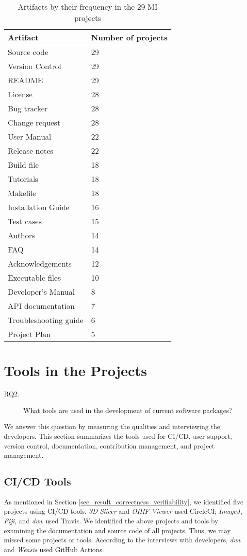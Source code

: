 \begin{table}[H]
\centering
\begin{tabular}{ll}
\hline
Artifact & Number of projects \\ \hline
Source code & 29 \\
Version Control & 29 \\
README & 29 \\
License & 28 \\
Bug tracker & 28 \\
Change request & 28 \\
User Manual & 22 \\
Release notes & 22 \\
Build file & 18 \\
Tutorials & 18 \\
Makefile & 18 \\
Installation Guide & 16 \\
Test cases & 15 \\
Authors & 14 \\
FAQ & 14 \\
Acknowledgements & 12 \\
Executable files & 10 \\
Developer's Manual & 8 \\
API documentation & 7 \\
Troubleshooting guide & 6 \\
Project Plan & 5 \\ \hline
\end{tabular}
\caption{\label{tab_artifacts_frequency}Artifacts by their frequency in the 29 MI projects}
\end{table}

\section{Tools in the Projects}
\label{sec_rq_tools}
\begin{description}
\item[RQ2.] What tools are used in the development of current software packages?
\end{description}

We answer this question by measuring the qualities and interviewing the developers. This section summarizes the tools used for CI/CD, user support, version control, documentation, contribution management, and project management. 

\subsection{CI/CD Tools}
As mentioned in Section \ref{sec_result_correctness_verifiability}, we identified five projects using CI/CD tools. \textit{3D Slicer} and \textit{OHIF Viewer} used CircleCI; \textit{ImageJ}, \textit{Fiji}, and \textit{dwv} used Travis. We identified the above projects and tools by examining the documentation and source code of all projects. Thus, we may missed some projects or tools. According to the interviews with developers, \textit{dwv} and \textit{Weasis} used GitHub Actions.

